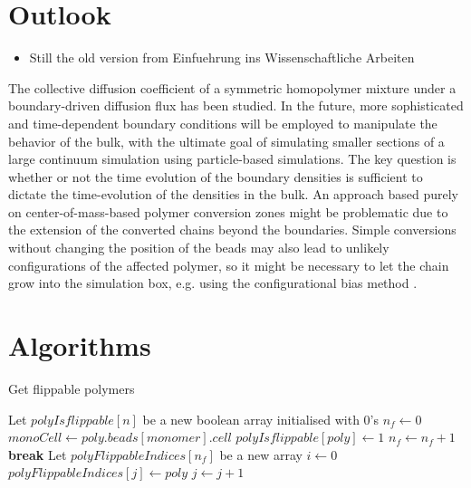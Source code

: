 \documentclass[bachelor,       %
               twoside,        %
               BCOR10mm,       %
               ngerman, english %
               ]{GAUBM}
\begin{document}
 
\chapter{Outlook}

\begin{itemize}
    \item Still the old version from Einfuehrung ins Wissenschaftliche Arbeiten
\end{itemize}

The collective diffusion coefficient of a symmetric homopolymer mixture under a boundary-driven diffusion flux has been studied. In the future, more sophisticated and time-dependent boundary conditions will be employed to manipulate the behavior of the bulk, with the ultimate goal of simulating smaller sections of a large continuum simulation using particle-based simulations. The key question is whether or not the time evolution of the boundary densities is sufficient to dictate the time-evolution of the densities in the bulk. An approach based purely on center-of-mass-based polymer conversion zones might be problematic due to the extension of the converted chains beyond the boundaries. Simple conversions without changing the position of the beads may also lead to unlikely configurations of the affected polymer, so it might be necessary to let the chain grow into the simulation box, e.g. using the configurational bias method \cite{ConfBias}.
\appendix

\chapter{Algorithms}


\begin{algorithm}
\caption{Get flippable polymers}\label{alg:get_flip_candidates}
\begin{algorithmic}
\State Let $polyIsflippable[n]$ be a new boolean array initialised with $0$'s
\State $n_f\gets 0$
        \State $monoCell\gets poly.beads[monomer].cell$
            \State $polyIsflippable[poly]\gets 1$
            \State $n_f\gets n_f+1$
            \State \textbf{break}
        \EndIf
    \EndFor
\EndFor
\State Let $polyFlippableIndices[n_f]$ be a new array
\State $i\gets 0$
        \State $polyFlippableIndices[j]\gets poly$
        \State $j\gets j+1$
    \EndIf
\EndFor
\end{algorithmic}
\end{algorithm}
\end{document}
